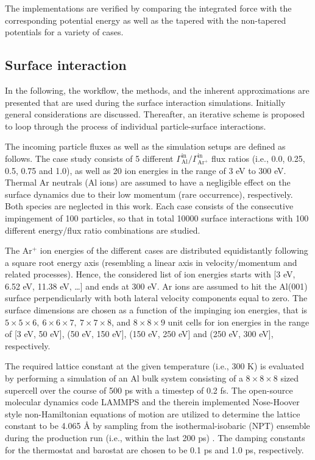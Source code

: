 \documentclass[12pt,a4paper,preprint,superscriptaddress]{revtex4-1}
\begin{document}
The implementations are verified by comparing the integrated force with the corresponding potential energy as well as the tapered with the non-tapered potentials for a variety of cases. 

\subsection{Surface interaction}
\label{ssec:surface_interaction}

In the following, the workflow, the methods, and the inherent approximations are presented that are used during the surface interaction simulations. Initially general considerations are discussed. Thereafter, an iterative scheme is proposed to loop through the process of individual particle-surface interactions.

The incoming particle fluxes as well as the simulation setups are defined as follows. The case study consists of 5 different $\Gamma_\mathrm{Al}^\mathrm{in}/\Gamma_\mathrm{Ar^+}^\mathrm{in}$ flux ratios (i.e., 0.0, 0.25, 0.5, 0.75 and 1.0), as well as 20 ion energies in the range of 3 eV to 300 eV. Thermal Ar neutrals (Al ions) are assumed to have a negligible effect on the surface dynamics due to their low momentum (rare occurrence), respectively. Both species are neglected in this work. Each case consists of the consecutive impingement of 100 particles, so that in total 10000 surface interactions with 100 different energy/flux ratio combinations are studied.

The Ar$^+$ ion energies of the different cases are distributed equidistantly following a square root energy axis (resembling a linear axis in velocity/momentum and related processes). Hence, the considered list of ion energies starts with [3 eV, 6.52 eV, 11.38 eV, \dots] and ends at 300 eV. Ar ions are assumed to hit the Al(001) surface perpendicularly with both lateral velocity components equal to zero. The surface dimensions are chosen as a function of the impinging ion energies, that is $5\times5\times6,~6\times6\times7,~7\times7\times8$, and $8\times8\times9$ unit cells for ion energies in the range of [3 eV, 50 eV], (50 eV, 150 eV], (150 eV, 250 eV] and (250 eV, 300 eV], respectively. 

The required lattice constant at the given temperature (i.e., 300 K) is evaluated by performing a simulation of an Al bulk system consisting of a $8\times8\times8$ sized supercell over the course of 500 ps with a timestep of 0.2 fs. The open-source molecular dynamics code LAMMPS \citep{plimpton1995fast,thompson2022lammps} and the therein implemented Nose-Hoover style non-Hamiltonian equations of motion are utilized to determine the lattice constant to be 4.065 \r A by sampling from the isothermal-isobaric (NPT) ensemble during the production run (i.e., within the last 200 ps) \citep{plimpton1995fast,thompson2022lammps,dullweber1997symplectic,martyna1994constant,shinoda2004rapid,tuckerman2006liouville,parrinello1981polymorphic}. The damping constants for the thermostat and barostat are chosen to be 0.1 ps and 1.0 ps, respectively.
\end{document}
